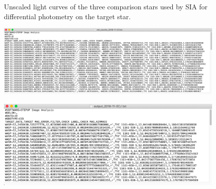 \documentclass[11pt]{report}
\begin{document}
\begin{figure}[!htb]
  \label{fig:comp3}
\endminipage
\caption{Unscaled light curves of the three comparison stars used by SIA for differential photometry on the target star.}
\label{fig:complc}
\end{figure}

\begin{figure}[!h]\label{fig:waspexcount}
\begin{center}
\includegraphics[totalheight=.17\textheight]{excountout.png}
\end{center}
\end{figure}

\begin{figure}[!h]\label{fig:waspexmag}
\begin{center}
\includegraphics[totalheight=.17\textheight]{exmagout.png}
\end{center}
\end{figure}

\end{document}
